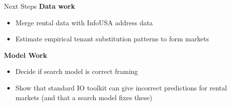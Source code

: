 \documentclass[10pt, xcolor=dvipsnames]{beamer}
\begin{document}
\begin{frame}{Next Steps}
\textbf{Data work}
    \begin{itemize}
        \item Merge rental data with InfoUSA address data
        \item Estimate empirical tenant substitution patterns to form markets
    \end{itemize}
\textbf{Model Work}
\begin{itemize}
    \item Decide if search model is correct framing
    \item Show that standard IO toolkit can give incorrect predictions for rental markets (and that a search model fixes these)
\end{itemize}
\end{frame}
\end{document}
